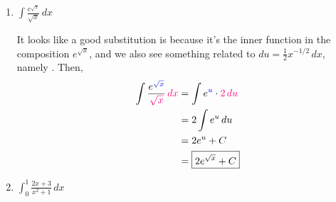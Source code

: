 \documentclass[main]{subfiles}
\begin{document}
\begin{enumerate}
\begin{enumerate}
  \item
    \begin{problem}[\stretch{0.5}]
      $\displaystyle \int \frac{e^{\sqrt{x}}}{\sqrt{x}}\,dx$
    \end{problem}

    \begin{solution}
      It looks like a good substitution is 
      because it's the inner function in the composition $e^{\sqrt{x}}$,
      and we also see something related to $du = \frac{1}{2}
      x^{-1/2}\,dx$, namely .  Then,
      \begin{align*}
        \int \frac{e^{\sub{\sqrt{x}}}}{\subd{\sqrt{x}}}\,\subd{dx} &= 
        \int e^\sub{u} \cdot \subd{2\,du} \\
        &= 2 \int e^u\,du \\
        &= 2 e^u + C \\
        &= \boxed{2 e^{\sqrt{x}} + C}
      \end{align*}
    \end{solution}

  \item

    \begin{problem}[\vfill]
      $\displaystyle \int_0^1 \frac{2x+3}{x^2+1}\,dx$
    \end{problem}


\end{enumerate}
\end{enumerate}
\end{document}
